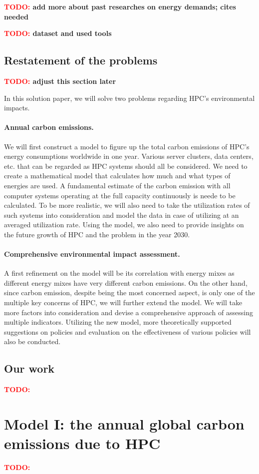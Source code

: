 \documentclass{article}
\newcommand{\todo}[1]{\textbf{\textcolor{red}{TODO:} #1}}
\begin{document}
\todo{add more about past researches on energy demands; cites needed}

\todo{dataset and used tools}

\subsection{Restatement of the problems}

\todo{adjust this section later}

In this solution paper, we will solve two problems regarding HPC's environmental impacts.

\paragraph{Annual carbon emissions.} We will first construct a model to figure up the total carbon emissions of HPC's energy consumptions worldwide in one year. Various server clusters, data centers, etc. that can be regarded as HPC systems should all be considered. We need to create a mathematical model that calculates how much and what types of energies are used. A fundamental estimate of the carbon emission with all computer systems operating at the full capacity continuously is neede to be calculated. To be more realistic, we will also need to take the utilization rates of such systems into consideration and model the data in case of utilizing at an averaged utilization rate. Using the model, we also need to provide insights on the future growth of HPC and the problem in the year 2030.

\paragraph{Comprehensive environmental impact assessment.} A first refinement on the model will be its correlation with energy mixes as different energy mixes have very different carbon emissions. On the other hand, since carbon emission, despite being the most concerned aspect, is only one of the multiple key concerns of HPC, we will further extend the model. We will take more factors into consideration and devise a comprehensive approach of assessing multiple indicators. Utilizing the new model, more theoretically supported suggestions on policies and evaluation on the effectiveness of various policies will also be conducted.

\subsection{Our work}

\todo{}

\section{Model I: the annual global carbon emissions due to HPC}

\todo{}



\end{document}
